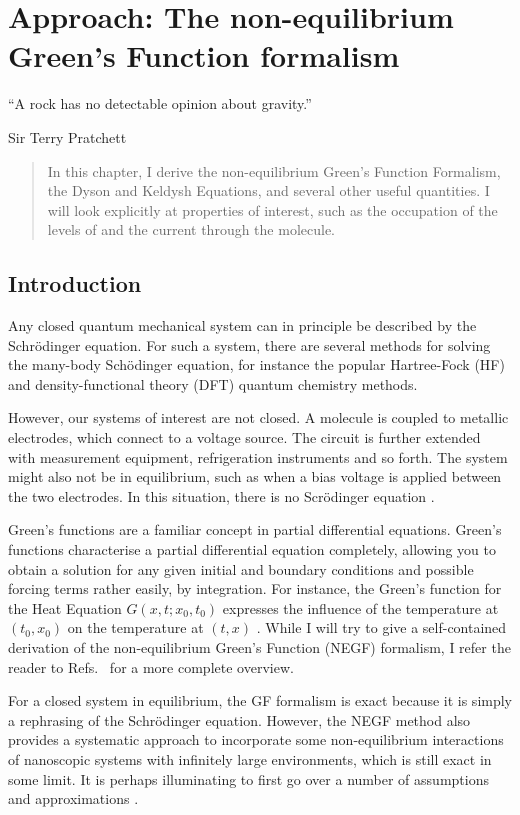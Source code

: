 \chapter{Approach: The non-equilibrium Green's Function formalism}
\label{ch:chapter_2}

\epigraph{
    “A rock has no detectable opinion about gravity.”
}{Sir Terry Pratchett}

\begin{abstract}
In this chapter, I derive the non-equilibrium Green's Function Formalism, the Dyson and Keldysh Equations, and several other useful quantities. I will look explicitly at properties of interest, such as the occupation of the levels of and the current through the molecule.
\end{abstract}

\newpage
\section{Introduction}
Any closed quantum mechanical system can in principle be described by the Schr\"odinger equation. For such a system, there are several methods for solving the many-body Sch\"odinger equation, for instance the popular Hartree-Fock (HF) and density-functional theory (DFT) quantum chemistry methods.

However, our systems of interest are not closed. A molecule is coupled to metallic electrodes, which connect to a voltage source. The circuit is further extended with measurement equipment, refrigeration instruments and so forth. The system might also not be in equilibrium, such as when a bias voltage is applied between the two electrodes. In this situation, there is no Scr\"odinger equation \cite{seldenthuis}.

Green's functions are a familiar concept in partial differential equations. Green's functions characterise a partial differential equation completely, allowing you to obtain a solution for any given initial and boundary conditions and possible forcing terms rather easily, by integration. For instance, the Green's function for the Heat Equation $G(x,t; x_0, t_0)$ expresses the influence of the temperature at $(t_0, x_0)$ on the temperature at $(t,x)$ \cite{haberman}. 
While I will try to give a self-contained derivation of the non-equilibrium Green's Function (NEGF) formalism, I refer the reader to Refs.~\cite{mattuck,diventra,haugjauho, leeuwen} for a more complete overview.

For a closed system in equilibrium, the GF formalism is exact because it is simply a rephrasing of the Schr\"odinger equation. However, the NEGF method also provides a systematic approach to incorporate some non-equilibrium interactions of nanoscopic systems with infinitely large environments, which is still exact in some limit. It is perhaps illuminating to first go over a number of assumptions and approximations \cite{seldenthuis}. 

